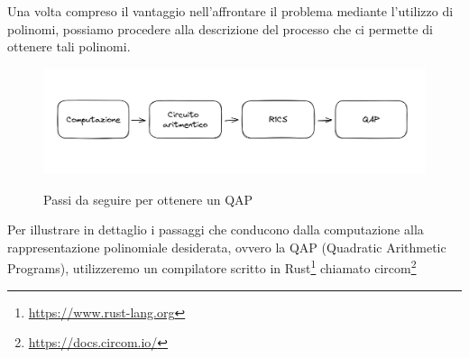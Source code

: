 Una volta compreso il vantaggio nell'affrontare il problema mediante l'utilizzo di polinomi, possiamo
procedere alla descrizione del processo che ci permette di ottenere tali polinomi.

\begin{figure}[H]
    \centering
    \includegraphics[width=14cm]{./chapters/1.state-of-art/images/8.comp_qap.png}
    \label{fig:comp-qap}
    \captionsetup{justification=centering}
    \caption{Passi da seguire per ottenere un QAP}
\end{figure}

Per illustrare in dettaglio i passaggi che conducono dalla computazione alla rappresentazione polinomiale desiderata,
ovvero la QAP (Quadratic Arithmetic Programs), utilizzeremo un compilatore scritto in Rust\footnote{\url{https://www.rust-lang.org}} chiamato circom\footnote{\url{https://docs.circom.io/}}


